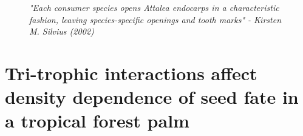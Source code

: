 \documentclass[b5paper,justified]{tufte-book} %
\begin{document}
\vspace*{20cm}

\begin{landscape}
\begin{figure}
\vspace*{-.6cm}\hspace*{4.4cm}
\hspace*{5cm}\begin{minipage}{18cm}
 \textit{ \footnotesize "Each consumer species opens \textit{Attalea} endocarps in a characteristic fashion, leaving species-specific openings and tooth marks" - Kirsten M. Silvius (2002) }
\end{minipage}
\label{fig:chap2}
\end{figure}
\end{landscape}

\chapter{Tri-trophic interactions affect density dependence of seed fate in a tropical forest palm}
\label{ch2} 

\end{document}
